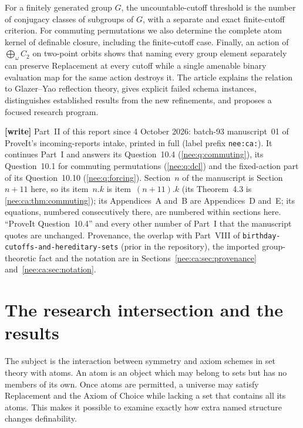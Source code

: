 \documentclass[11pt,letterpaper]{article}
\numberwithin{equation}{section}
\theoremstyle{plain}
\theoremstyle{definition}
\theoremstyle{remark}
\begin{document}
For a finitely generated group $G$, the uncountable-cutoff threshold is the number of conjugacy classes of subgroups of $G$, with a separate and exact finite-cutoff criterion. For commuting permutations we also determine the complete atom kernel of definable closure, including the finite-cutoff case. Finally, an action of $\bigoplus_\omega C_2$ on two-point orbits shows that naming every group element separately can preserve Replacement at every cutoff while a single amenable binary evaluation map for the same action destroys it. The article explains the relation to Glazer--Yao reflection theory, gives explicit failed schema instances, distinguishes established results from the new refinements, and proposes a focused research program.

{\footnotesize\noindent\textbf{[write]} Part~II of this report since 4 October 2026: batch-93 manuscript~01 of ProveIt's incoming-reports intake, printed in full (label prefix \texttt{nee:ca:}). It continues Part~I and answers its Question~10.4 (\cref{nee:q:commuting}), its Question~10.1 for commuting permutations (\cref{nee:q:dcl}) and the fixed-action part of its Question~10.10 (\cref{nee:q:forcing}). Section~$n$ of the manuscript is Section~$n+11$ here, so its item~$n.k$ is item~$(n+11).k$ (its Theorem~4.3 is \cref{nee:ca:thm:commuting}); its Appendices~A and~B are Appendices~D and~E; its equations, numbered consecutively there, are numbered within sections here. ``ProveIt Question~10.4'' and every other number of Part~I that the manuscript quotes are unchanged. Provenance, the overlap with Part~VIII of \nolinkurl{birthday-cutoffs-and-hereditary-sets} (prior in the repository), the imported group-theoretic fact and the notation are in Sections~\ref{nee:ca:sec:provenance} and~\ref{nee:ca:sec:notation}.\par}

\section{The research intersection and the results}\label{nee:ca:sec:intro}

The subject is the interaction between symmetry and axiom schemes in set theory with atoms. An atom is an object which may belong to sets but has no members of its own. Once atoms are permitted, a universe may satisfy Replacement and the Axiom of Choice while lacking a set that contains all its atoms. This makes it possible to examine exactly how extra named structure changes definability.
\end{document}
